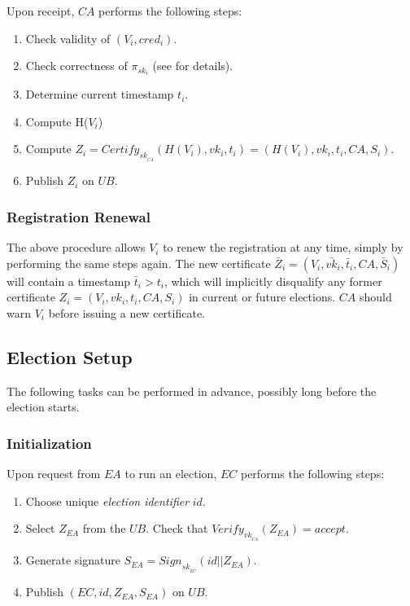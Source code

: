 \documentclass[bibtotoc,halfparskip,oneside]{scrreprt}
\newcommand{\eid}{\mathit{id}\xspace}
\newcommand{\cred}[1]{cred_{#1}\xspace}
\newcommand{\sk}[1]{\mathit{sk}_{#1}\xspace}
\newcommand{\vk}[1]{\mathit{vk}_{#1}\xspace}
\newcommand{\vkbar}[1]{\bar{\mathit{vk}}_{#1}\xspace}
\newcommand{\SK}[1]{\sk{_#1}\xspace}
\newcommand{\VK}[1]{\vk{_#1}\xspace}
\newcommand{\CA}{\ensuremath{\mathit{CA}}\xspace}
\newcommand{\EA}{\ensuremath{\mathit{EA}}\xspace}
\newcommand{\EC}{\ensuremath{\mathit{EC}}\xspace}
\newcommand{\UB}{\ensuremath{\mathit{UB}}\xspace}
\newcommand{\Voter}[1]{\ensuremath{\mathit{V}_{#1}}\xspace}
\begin{document}
Upon receipt, \CA performs the following steps:
\begin{enumerate}[resume]
	\item Check validity of $(\Voter{i},\cred{i})$.
	\item Check correctness of $\pi_{\sk{i}}$ (see  for details).
	\item Determine current timestamp $t_i$.
	\item Compute H(\Voter{i})
	\item Compute $Z_i=\mathit{Certify}_{\SK{\CA}}(H(\Voter{i}),\vk{i},t_i)=(H(\Voter{i}),\vk{i},t_i,\CA,S_i)$.
	\item Publish $Z_i$ on \UB.
\end{enumerate}

\subsubsection{Registration Renewal}
The above procedure allows $\Voter{i}$ to renew the registration at any time, simply by performing the same steps again. The new certificate $\bar{Z}_i=(\Voter{i},\vkbar{i},\bar{t}_i,\CA,\bar{S}_i)$ will contain a timestamp $\bar{t}_i>t_i$, which will implicitly disqualify any former certificate $Z_i=(\Voter{i},\vk{i},t_i,\CA,S_i)$ in current or future elections. \CA should warn $\Voter{i}$ before issuing a new certificate.

\subsection{Election Setup}

The following tasks can be performed in advance, possibly long before the election starts.

\subsubsection{Initialization}

Upon request from \EA to run an election, \EC performs the following steps: 
\begin{enumerate}
	\item Choose unique \emph{election identifier} $\eid$.
	\item Select $Z_{\EA}$ from the \UB. Check that $\mathit{Verify}_{\VK{\CA}}(Z_{\EA})=\mathit{accept}$.
	\item Generate signature $S_{\EA}=\mathit{Sign}_{\SK{\EC}}(\eid||Z_{\EA})$. 
	\item Publish $(\EC,\eid,Z_{\EA},S_{\EA})$ on \UB.
\end{enumerate}
\end{document}
